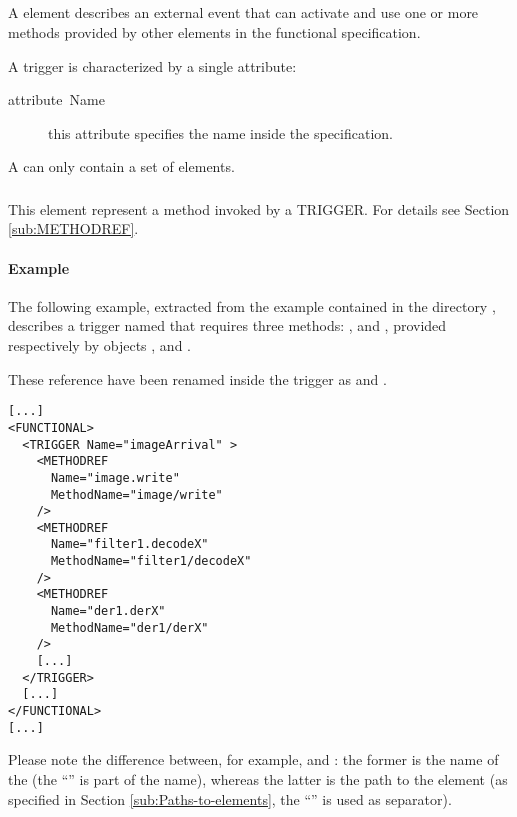 \subsection{}

A  element describes an external event that can
activate and use one or more methods provided by other elements in the
functional specification.

A trigger is characterized by a single attribute:

\begin{description}
\item [{attribute~Name}] this attribute specifies the 
  name inside the  specification.
\end{description}

A  can only contain a set of 
elements.


\subsubsection{}

This element represent a method invoked by a TRIGGER. For details see
Section \ref{sub:METHODREF}.


\paragraph{Example}

The following example, extracted from the example contained in the
directory , describes a trigger named 
that requires three methods: ,  and
, provided respectively by objects , 
and .

These reference have been renamed inside the trigger as 
 and .

\begin{lstlisting}
[...]
<FUNCTIONAL>
  <TRIGGER Name="imageArrival" >
    <METHODREF
      Name="image.write"
      MethodName="image/write"
    />
    <METHODREF
      Name="filter1.decodeX"
      MethodName="filter1/decodeX"
    />
    <METHODREF
      Name="der1.derX"
      MethodName="der1/derX"
    />
    [...]
  </TRIGGER>
  [...]
</FUNCTIONAL>
[...]
\end{lstlisting}

Please note the difference between, for example,  and
: the former is the name of the 
(the ``'' is part of the name), whereas the latter is the
path to the  element (as specified in Section
\ref{sub:Paths-to-elements}, the ``\const{/}'' is used as separator).


